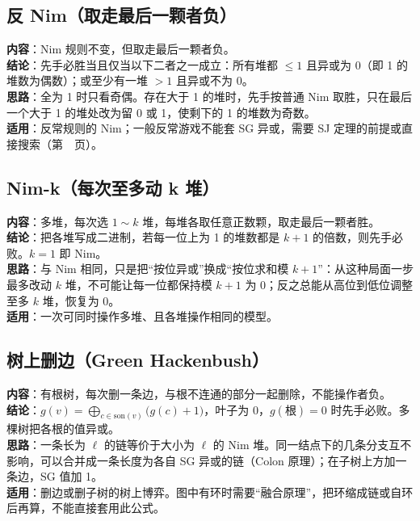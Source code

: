 \subsection{反 Nim（取走最后一颗者负）}\label{knowledge-game-anti-nim}
\textbf{内容}：Nim 规则不变，但取走最后一颗者负。\\
\textbf{结论}：先手必胜当且仅当以下二者之一成立：所有堆都 $\le1$ 且异或为 $0$（即 1 的堆数为偶数）；或至少有一堆 $>1$ 且异或不为 $0$。\\
\textbf{思路}：全为 1 时只看奇偶。存在大于 1 的堆时，先手按普通 Nim 取胜，只在最后一个大于 1 的堆处改为留 0 或 1，使剩下的 1 的堆数为奇数。\\
\textbf{适用}：反常规则的 Nim；一般反常游戏不能套 SG 异或，需要 SJ 定理的前提或直接搜索（第~\pageref{knowledge-subtraction-game}~页）。



\subsection{Nim-k（每次至多动 k 堆）}\label{knowledge-game-nim-k}
\textbf{内容}：多堆，每次选 $1\sim k$ 堆，每堆各取任意正数颗，取走最后一颗者胜。\\
\textbf{结论}：把各堆写成二进制，若每一位上为 1 的堆数都是 $k+1$ 的倍数，则先手必败。$k=1$ 即 Nim。\\
\textbf{思路}：与 Nim 相同，只是把“按位异或”换成“按位求和模 $k+1$”：从这种局面一步最多改动 $k$ 堆，不可能让每一位都保持模 $k+1$ 为 0；反之总能从高位到低位调整至多 $k$ 堆，恢复为 0。\\
\textbf{适用}：一次可同时操作多堆、且各堆操作相同的模型。



\subsection{树上删边（Green Hackenbush）}\label{knowledge-game-hackenbush}
\textbf{内容}：有根树，每次删一条边，与根不连通的部分一起删除，不能操作者负。\\
\textbf{结论}：$g(v)=\bigoplus_{c\in\mathrm{son}(v)}\bigl(g(c)+1\bigr)$，叶子为 $0$，$g(\text{根})=0$ 时先手必败。多棵树把各根的值异或。\\
\textbf{思路}：一条长为 $\ell$ 的链等价于大小为 $\ell$ 的 Nim 堆。同一结点下的几条分支互不影响，可以合并成一条长度为各自 SG 异或的链（Colon 原理）；在子树上方加一条边，SG 值加 1。\\
\textbf{适用}：删边或删子树的树上博弈。图中有环时需要“融合原理”，把环缩成链或自环后再算，不能直接套用此公式。



